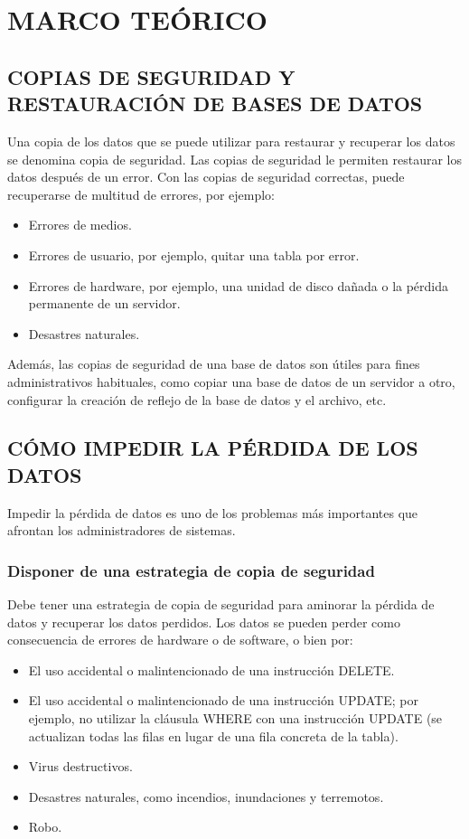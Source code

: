 \chapter{MARCO TEÓRICO}
\section{COPIAS DE SEGURIDAD Y RESTAURACIÓN DE BASES DE DATOS}
Una copia de los datos que se puede utilizar para restaurar y recuperar los datos se denomina copia de seguridad. Las copias de seguridad le permiten restaurar los datos después de un error. Con las copias de seguridad correctas, puede recuperarse de multitud de errores, por ejemplo:



\begin{itemize}
\item       Errores de medios.
\item       Errores de usuario, por ejemplo, quitar una tabla por error.
\item       Errores de hardware, por ejemplo, una unidad de disco dañada o la pérdida permanente de un servidor.
\item       Desastres naturales.
\end{itemize}

 Además, las copias de seguridad de una base de datos son útiles para fines administrativos habituales, como copiar una base de datos de un servidor a otro, configurar la creación de reflejo de la base de datos y el archivo, etc.

\section{CÓMO IMPEDIR LA PÉRDIDA DE LOS DATOS}
Impedir la pérdida de datos es uno de los problemas más importantes que afrontan los administradores de sistemas.

\subsection{Disponer de una estrategia de copia de seguridad}
Debe tener una estrategia de copia de seguridad para aminorar la pérdida de datos y recuperar los datos perdidos. Los datos se pueden perder como consecuencia de errores de hardware o de software, o bien por:

\begin{itemize}
\item El uso accidental o malintencionado de una instrucción DELETE.
\item  El uso accidental o malintencionado de una instrucción UPDATE; por ejemplo, no utilizar la cláusula WHERE con una instrucción UPDATE (se actualizan todas las filas en lugar de una fila concreta de la tabla).
\item  Virus destructivos.
\item  Desastres naturales, como incendios, inundaciones y terremotos.
\item  Robo.
\end{itemize}

